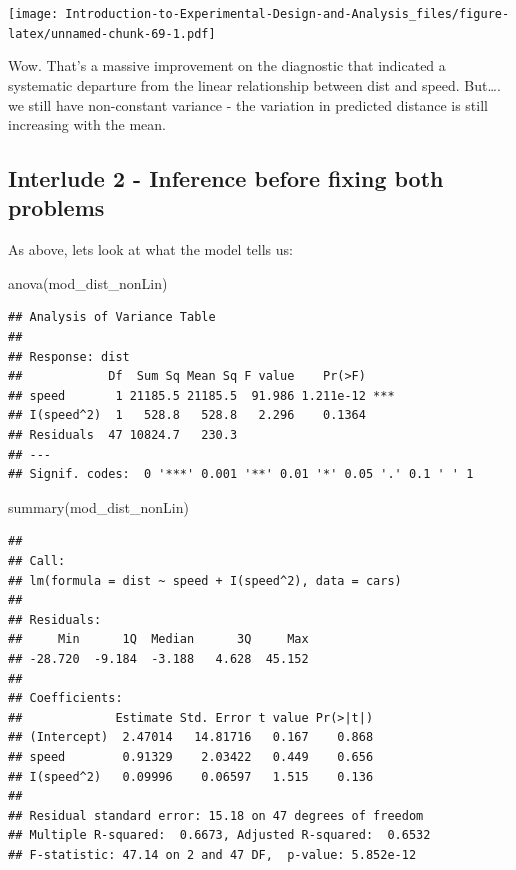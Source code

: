 \documentclass[
]{book}
\newenvironment{Shaded}{\begin{snugshade}}{\end{snugshade}}
\newcommand{\FunctionTok}[1]{\textcolor[rgb]{0.00,0.00,0.00}{#1}}
\newcommand{\NormalTok}[1]{#1}
\begin{document}
\texttt{[image: Introduction-to-Experimental-Design-and-Analysis\_files/figure-latex/unnamed-chunk-69-1.pdf]}

Wow. That's a massive improvement on the diagnostic that indicated a systematic departure from the linear relationship between dist and speed. But\ldots. we still have non-constant variance - the variation in predicted distance is still increasing with the mean.

\hypertarget{interlude-2---inference-before-fixing-both-problems}{%
\subsection{Interlude 2 - Inference before fixing both problems}\label{interlude-2---inference-before-fixing-both-problems}}

As above, lets look at what the model tells us:

\begin{Shaded}
\begin{Highlighting}[]
\FunctionTok{anova}\NormalTok{(mod\_dist\_nonLin)}
\end{Highlighting}
\end{Shaded}

\begin{verbatim}
## Analysis of Variance Table
## 
## Response: dist
##            Df  Sum Sq Mean Sq F value    Pr(>F)    
## speed       1 21185.5 21185.5  91.986 1.211e-12 ***
## I(speed^2)  1   528.8   528.8   2.296    0.1364    
## Residuals  47 10824.7   230.3                      
## ---
## Signif. codes:  0 '***' 0.001 '**' 0.01 '*' 0.05 '.' 0.1 ' ' 1
\end{verbatim}

\begin{Shaded}
\begin{Highlighting}[]
\FunctionTok{summary}\NormalTok{(mod\_dist\_nonLin)}
\end{Highlighting}
\end{Shaded}

\begin{verbatim}
## 
## Call:
## lm(formula = dist ~ speed + I(speed^2), data = cars)
## 
## Residuals:
##     Min      1Q  Median      3Q     Max 
## -28.720  -9.184  -3.188   4.628  45.152 
## 
## Coefficients:
##             Estimate Std. Error t value Pr(>|t|)
## (Intercept)  2.47014   14.81716   0.167    0.868
## speed        0.91329    2.03422   0.449    0.656
## I(speed^2)   0.09996    0.06597   1.515    0.136
## 
## Residual standard error: 15.18 on 47 degrees of freedom
## Multiple R-squared:  0.6673, Adjusted R-squared:  0.6532 
## F-statistic: 47.14 on 2 and 47 DF,  p-value: 5.852e-12
\end{verbatim}
\end{document}
